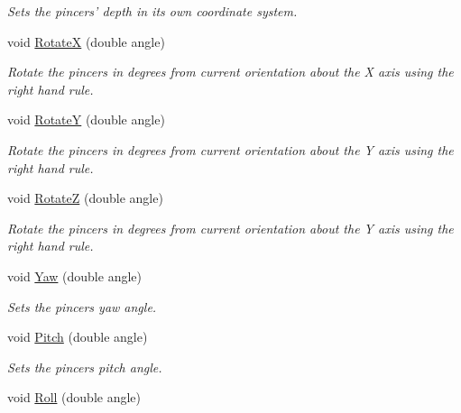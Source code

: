 \begin{DoxyCompactItemize}
\begin{DoxyCompactList}\small\item\em Sets the pincers' depth in its own coordinate system. \item\end{DoxyCompactList}\item 
void \hyperlink{classvtkToolPincers_ac6b80a0c7a43ae67cfafbe29772b41d0}{RotateX} (double angle)
\begin{DoxyCompactList}\small\item\em Rotate the pincers in degrees from current orientation about the X axis using the right hand rule. \item\end{DoxyCompactList}\item 
void \hyperlink{classvtkToolPincers_aa2a15405aa65c96dd971e3c06d98d197}{RotateY} (double angle)
\begin{DoxyCompactList}\small\item\em Rotate the pincers in degrees from current orientation about the Y axis using the right hand rule. \item\end{DoxyCompactList}\item 
void \hyperlink{classvtkToolPincers_ad7a4a9f0e3291b88eb4e30986784539a}{RotateZ} (double angle)
\begin{DoxyCompactList}\small\item\em Rotate the pincers in degrees from current orientation about the Y axis using the right hand rule. \item\end{DoxyCompactList}\item 
\hypertarget{classvtkToolPincers_a745e9e89bf3e6af18e0773832f12cd32}{
void \hyperlink{classvtkToolPincers_a745e9e89bf3e6af18e0773832f12cd32}{Yaw} (double angle)}
\label{classvtkToolPincers_a745e9e89bf3e6af18e0773832f12cd32}

\begin{DoxyCompactList}\small\item\em Sets the pincers yaw angle. \item\end{DoxyCompactList}\item 
\hypertarget{classvtkToolPincers_adc735e3595ec2aa0657949f0ede82a26}{
void \hyperlink{classvtkToolPincers_adc735e3595ec2aa0657949f0ede82a26}{Pitch} (double angle)}
\label{classvtkToolPincers_adc735e3595ec2aa0657949f0ede82a26}

\begin{DoxyCompactList}\small\item\em Sets the pincers pitch angle. \item\end{DoxyCompactList}\item 
\hypertarget{classvtkToolPincers_a490fe992c0a475b4ade44cca05521d71}{
void \hyperlink{classvtkToolPincers_a490fe992c0a475b4ade44cca05521d71}{Roll} (double angle)}
\label{classvtkToolPincers_a490fe992c0a475b4ade44cca05521d71}


\end{DoxyCompactItemize}

